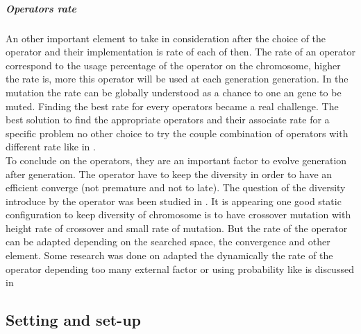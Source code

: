 \subparagraph{Operators rate}
 An other important element to take in consideration after the choice of the operator and their implementation is  rate of each of then. 
The rate of an operator correspond to the usage percentage of the operator on the chromosome, higher the rate is,  more this operator will be used at each generation generation. 
In the mutation the rate can be globally understood as a chance to one an gene to be muted. 
Finding the  best rate for every operators became a real challenge. The best solution to find the appropriate  operators and their associate rate for a specific problem no other choice to try the couple combination of operators with different rate like in \cite{73*wright1991,71*grefenstette1986,133*schwefel1984}.\\

 To conclude on the operators, they are an important factor to evolve generation after generation.  The operator have to keep the diversity  in order to have an efficient converge (not premature and not to late). The question of the diversity introduce by the operator was been studied in  \cite{80*serpell2010,95*miller1995} \cite{113*mais2010}. 
 It is appearing one good static configuration to keep diversity \cite{64*matsui1999} of chromosome is to have crossover mutation with height rate of crossover and small rate of mutation. 
But the rate of the operator can be adapted depending on the searched space, the convergence and other element. Some research was done on adapted the dynamically the rate of the operator depending too many external factor or using probability like is discussed in  \cite{110*eiben2003,133*schwefel1984,94*srinivas1994}


	
\subsection{Setting and  set-up} \label{sec:Setting and  set-up}

